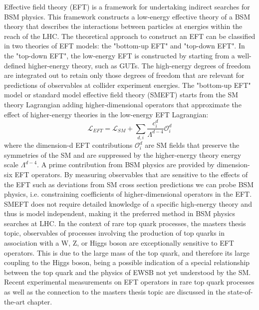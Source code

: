 Effective field theory (EFT) is a framework for undertaking indirect searches for BSM physics. This framework constructs a low-energy effective theory of a BSM theory that describes the interactions between particles at energies within the reach of the LHC. The theoretical approach to construct an EFT can be classified in two theories of EFT models: the "bottom-up EFT" and "top-down EFT". In the "top-down EFT", the low-energy EFT is constructed by starting from a well-defined higher-energy theory, such as GUTs. The  high-energy degrees of freedom are integrated out to retain only those degrees of freedom that are relevant for predictions of observables at collider experiment energies. The "bottom-up EFT" model or standard model effective field theory (SMEFT) starts from the SM theory Lagrangian adding higher-dimensional operators that approximate the effect of higher-energy theories in the low-energy EFT Lagrangian:
\begin{equation}\label{EFT Lagrangian}
    \mathscr{L}_{EFT} = \mathscr{L}_{SM} + \sum_{d,i}\frac{c^d_i}{\Lambda^{d-4}}\mathcal{O}^d_i
\end{equation}
where the dimension-d EFT contributions $\mathcal{O}^d_i$ are SM fields that preserve the symmetries of the SM and are suppressed by the higher-energy theory energy scale $\Lambda^{d-4}$. A prime contribution from BSM physics are provided by dimension-six EFT operators. By measuring observables that are sensitive to the effects of the EFT such as deviations from SM cross section predictions we can probe BSM physics, i.e. constraining coefficients of higher-dimensional operators in the EFT. SMEFT does not require detailed knowledge of a specific high-energy theory and thus is model independent, making it the preferred method in BSM physics searches at LHC. In the context of rare top quark processes, the masters thesis topic, observables of processes involving the production of top quarks in association with a W, Z, or Higgs boson are exceptionally sensitive to EFT operators. This is due to the large mass of the top quark, and therefore its large coupling to the Higgs boson, being a possible indication of a special relationship between the top quark and the physics of EWSB not yet understood by the SM. Recent experimental measurements on EFT operators in rare top quark processes as well as the connection to the masters thesis topic are discussed in the state-of-the-art chapter.